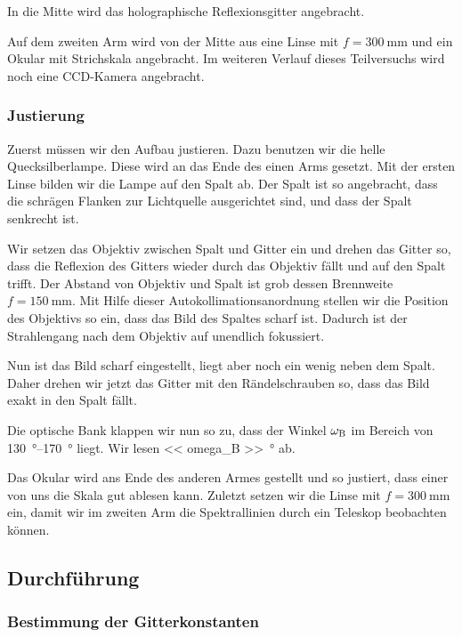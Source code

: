 In die Mitte wird das holographische Reflexionsgitter angebracht.

Auf dem zweiten Arm wird von der Mitte aus eine Linse mit $f =
\SI{300}{\milli\meter}$ und ein Okular mit Strichskala angebracht. Im weiteren
Verlauf dieses Teilversuchs wird noch eine CCD-Kamera angebracht.

\FloatBarrier
\subsubsection{Justierung}

Zuerst müssen wir den Aufbau justieren. Dazu benutzen wir die helle
Quecksilberlampe. Diese wird an das Ende des einen Arms gesetzt. Mit der ersten
Linse bilden wir die Lampe auf den Spalt ab. Der Spalt ist so angebracht, dass
die schrägen Flanken zur Lichtquelle ausgerichtet sind, und dass der Spalt
senkrecht ist.

Wir setzen das Objektiv zwischen Spalt und Gitter ein und drehen das Gitter so,
dass die Reflexion des Gitters wieder durch das Objektiv fällt und auf den
Spalt trifft. Der Abstand von Objektiv und Spalt ist grob dessen Brennweite $f
= \SI{150}{\milli\meter}$. Mit Hilfe dieser Autokollimationsanordnung stellen
wir die Position des Objektivs so ein, dass das Bild des Spaltes scharf ist.
Dadurch ist der Strahlengang nach dem Objektiv auf unendlich fokussiert.

Nun ist das Bild scharf eingestellt, liegt aber noch ein wenig neben dem Spalt.
Daher drehen wir jetzt das Gitter mit den Rändelschrauben so, dass das Bild
exakt in den Spalt fällt.

Die optische Bank klappen wir nun so zu, dass der Winkel $\omega_\text B$ im
Bereich von \SIrange{130}{170}{\degree} liegt. Wir lesen \SI{<< omega_B
>>}{\degree} ab.

Das Okular wird ans Ende des anderen Armes gestellt und so justiert, dass einer
von uns die Skala gut ablesen kann. Zuletzt setzen wir die Linse mit $f =
\SI{300}{\milli\meter}$ ein, damit wir im zweiten Arm die Spektrallinien durch
ein Teleskop beobachten können.

\FloatBarrier
\subsection{Durchführung}

\FloatBarrier
\subsubsection{Bestimmung der Gitterkonstanten}
\label{sec:gitterkonstante/durchführung}

